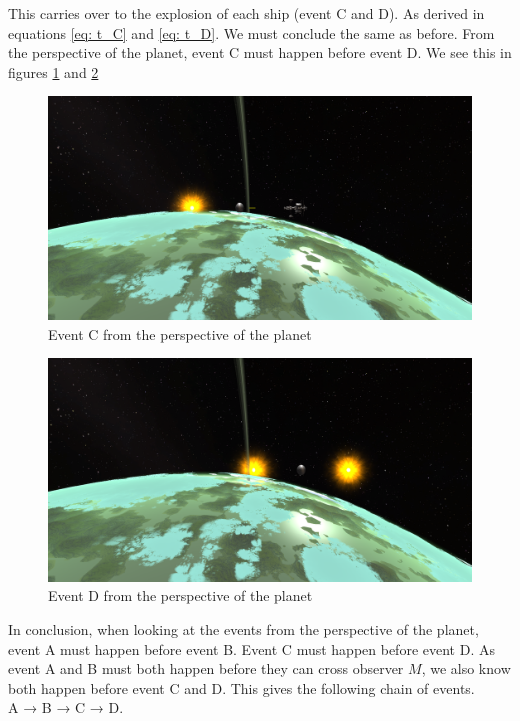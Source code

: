 \documentclass[reprint,english,notitlepage]{revtex4-2}
\begin{document}
  
  This carries over to the explosion of each ship (event C and D). As derived in equations \ref{eq: t_C} and \ref{eq: t_D}. We must conclude the same as before. From the perspective of the planet, event C must happen before event D. We see this in figures \ref{fig: C_Planet} and \ref{fig: D_Planet}
  \begin{figure}[h!]
    \centering
    \includegraphics[scale = .1]{figures/C_Planet.png}
    \caption{Event C from the perspective of the planet}
    \label{fig: C_Planet}
  \end{figure}
  \begin{figure}[h!]
    \centering
    \includegraphics[scale = .1]{figures/D_Planet.png}
    \caption{Event D from the perspective of the planet}
    \label{fig: D_Planet}
  \end{figure}
  
  In conclusion, when looking at the events from the perspective of the planet, event A must happen before event B. Event C must happen before event D. As event A and B must both happen before they can cross observer $ M $, we also know both happen before event C and D. This gives the following chain of events. \\
  A → B → C → D.\\
  
\end{document}
